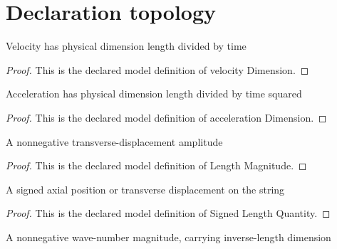 \section{Declaration topology}
\begin{definition}
  \label{def:physics:phyx-mini-0302:phyxminiproblems-problemphyxmini0302-velocitydimension}
  Velocity has physical dimension length divided by time
\end{definition}
\begin{proof}
  This is the declared model definition of velocity Dimension.
\end{proof}
\begin{definition}
  \label{def:physics:phyx-mini-0302:phyxminiproblems-problemphyxmini0302-accelerationdimension}
  Acceleration has physical dimension length divided by time squared
\end{definition}
\begin{proof}
  This is the declared model definition of acceleration Dimension.
\end{proof}
\begin{definition}
  \label{def:physics:phyx-mini-0302:phyxminiproblems-problemphyxmini0302-lengthmagnitude}
  A nonnegative transverse-displacement amplitude
\end{definition}
\begin{proof}
  This is the declared model definition of Length Magnitude.
\end{proof}
\begin{definition}
  \label{def:physics:phyx-mini-0302:phyxminiproblems-problemphyxmini0302-signedlengthquantity}
  A signed axial position or transverse displacement on the string
\end{definition}
\begin{proof}
  This is the declared model definition of Signed Length Quantity.
\end{proof}
\begin{definition}
  \label{def:physics:phyx-mini-0302:phyxminiproblems-problemphyxmini0302-wavenumbermagnitude}
  A nonnegative wave-number magnitude, carrying inverse-length dimension
\end{definition}
